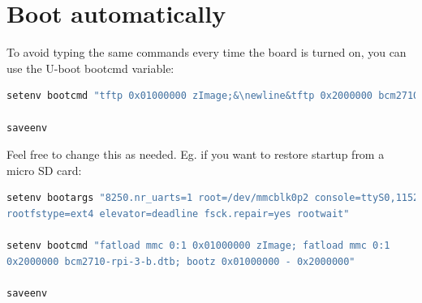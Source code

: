 \documentclass[11pt]{article}
\begin{document}
\section{Boot automatically}
To avoid typing the same commands every time the board is turned on, you can
 use the U-boot bootcmd variable:
\begin{lstlisting}[language=bash,escapechar=\&]
setenv bootcmd "tftp 0x01000000 zImage;&\newline&tftp 0x2000000 bcm2710-rpi-3-b.dtb;bootz 0x01000000 - 0x2000000"

saveenv
\end{lstlisting}
Feel free to change this as needed. Eg. if you want to restore startup from a
 micro SD card:
\begin{lstlisting}[language=bash]
setenv bootargs "8250.nr_uarts=1 root=/dev/mmcblk0p2 console=ttyS0,115200
rootfstype=ext4 elevator=deadline fsck.repair=yes rootwait"

setenv bootcmd "fatload mmc 0:1 0x01000000 zImage; fatload mmc 0:1
0x2000000 bcm2710-rpi-3-b.dtb; bootz 0x01000000 - 0x2000000"

saveenv
\end{lstlisting}
\end{document}
